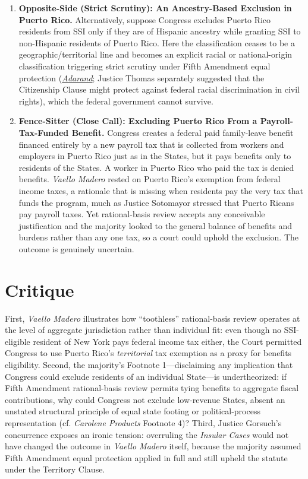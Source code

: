 \documentclass[12pt]{article}
\begin{document}
\begin{enumerate}
\item \textbf{Opposite-Side (Strict Scrutiny): An Ancestry-Based Exclusion in Puerto Rico.} Alternatively, suppose Congress excludes Puerto Rico residents from SSI only if they are of Hispanic ancestry while granting SSI to non-Hispanic residents of Puerto Rico. Here the classification ceases to be a geographic/territorial line and becomes an explicit racial or national-origin classification triggering strict scrutiny under Fifth Amendment equal protection (\href{https://supreme.justia.com/cases/federal/us/515/200/}{\emph{Adarand}}; Justice Thomas separately suggested that the Citizenship Clause might protect against federal racial discrimination in civil rights), which the federal government cannot survive.

\item \textbf{Fence-Sitter (Close Call): Excluding Puerto Rico From a Payroll-Tax-Funded Benefit.} Congress creates a federal paid family-leave benefit financed entirely by a new payroll tax that is collected from workers and employers in Puerto Rico just as in the States, but it pays benefits only to residents of the States. A worker in Puerto Rico who paid the tax is denied benefits. \textit{Vaello Madero} rested on Puerto Rico's exemption from federal income taxes, a rationale that is missing when residents pay the very tax that funds the program, much as Justice Sotomayor stressed that Puerto Ricans pay payroll taxes. Yet rational-basis review accepts any conceivable justification and the majority looked to the general balance of benefits and burdens rather than any one tax, so a court could uphold the exclusion. The outcome is genuinely uncertain.

\end{enumerate}

\section{Critique}
First, \emph{Vaello Madero} illustrates how ``toothless'' rational-basis review operates at the level of aggregate jurisdiction rather than individual fit: even though no SSI-eligible resident of New York pays federal income tax either, the Court permitted Congress to use Puerto Rico's \emph{territorial} tax exemption as a proxy for benefits eligibility. Second, the majority's Footnote 1---disclaiming any implication that Congress could exclude residents of an individual State---is undertheorized: if Fifth Amendment rational-basis review permits tying benefits to aggregate fiscal contributions, why could Congress not exclude low-revenue States, absent an unstated structural principle of equal state footing or political-process representation (cf. \emph{Carolene Products} Footnote 4)? Third, Justice Gorsuch's concurrence exposes an ironic tension: overruling the \emph{Insular Cases} would not have changed the outcome in \emph{Vaello Madero} itself, because the majority assumed Fifth Amendment equal protection applied in full and still upheld the statute under the Territory Clause.
\end{document}
